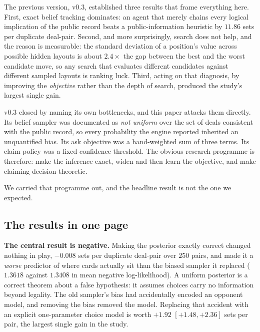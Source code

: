 \documentclass[11pt,letterpaper]{article}
\begin{document}
The previous version, v0.3, established three results that frame everything
here. First,
exact belief tracking dominates: an agent that merely chains every logical
implication of the public record beats a public-information heuristic by
$11.86$ sets per duplicate deal-pair. Second, and more surprisingly, search
does not help, and the reason is measurable: the standard deviation of a
position's value across possible hidden layouts is about $2.4\times$ the gap
between the best and the worst candidate move, so any search that evaluates
different candidates against different sampled layouts is ranking luck. Third,
acting on that diagnosis, by improving the \emph{objective} rather than the
depth of search, produced the study's largest single gain.

v0.3 closed by naming its own bottlenecks, and this paper attacks them
directly. Its belief sampler was documented as \emph{not uniform} over the set
of deals consistent with the public record, so every probability the engine
reported inherited an unquantified bias. Its ask objective was a hand-weighted
sum of three terms. Its claim policy was a fixed confidence threshold. The
obvious research programme is therefore: make the inference exact, widen and
then learn the objective, and make claiming decision-theoretic.

We carried that programme out, and the headline result is not the one we
expected.

\subsection{The results in one page}
\label{sec:onepage}

\textbf{The central result is negative.} Making the posterior exactly correct
changed nothing in play, $-0.008$ sets per duplicate deal-pair over $250$
pairs, and made it a \emph{worse} predictor of where cards actually sit than
the biased sampler it replaced ($1.3618$ against $1.3408$ in mean negative
log-likelihood). A uniform posterior is a correct theorem about a false
hypothesis: it assumes choices carry no information beyond legality. The old
sampler's bias had accidentally encoded an opponent model, and removing the
bias removed the model. Replacing that accident with an explicit one-parameter
choice model is worth $\mathbf{+1.92}$ $[+1.48, +2.36]$ sets per pair, the
largest single gain in the study.
\end{document}
